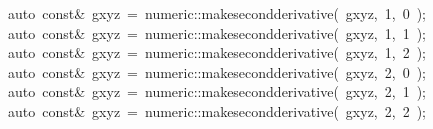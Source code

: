 \documentclass[9pt,onside,a4paper]{article}
\newcommand{\hlstd}[1]{\textcolor[rgb]{0.2,0,0.4}{#1}}
\newcommand{\hlnum}[1]{\textcolor[rgb]{0.2,0.73,0.02}{#1}}
\newcommand{\hlopt}[1]{\textcolor[rgb]{0.33,0.33,0.33}{#1}}
\newcommand{\hlkwb}[1]{\textcolor[rgb]{0.96,0.55,0.14}{#1}}
\newcommand{\hlkwc}[1]{\textcolor[rgb]{0,0,1}{#1}}
\newcommand{\hlkwd}[1]{\textcolor[rgb]{0.82,0.11,0.93}{#1}}
\begin{document}
{\hlstd{}\hlstd{\ \ \ \ }\hlstd{}\hlkwc{auto\ }\hlstd{}\hlkwb{const}\hlstd{}\hlopt{\&\ }\hlstd{gxyz\ }\hlopt{=\ }\hlstd{numeric}\hlopt{::}\hlstd{}\hlkwd{make\textunderscore second\textunderscore derivative}\hlstd{}\hlopt{(\ }\hlstd{gxyz}\hlopt{,\ }\hlstd{}\hlnum{1}\hlstd{}\hlopt{,\ }\hlstd{}\hlnum{0\ }\hlstd{}\hlopt{);}\hspace*{\fill}\\
\hlstd{}\hlstd{\ \ \ \ }\hlstd{}\hlkwc{auto\ }\hlstd{}\hlkwb{const}\hlstd{}\hlopt{\&\ }\hlstd{gxyz\ }\hlopt{=\ }\hlstd{numeric}\hlopt{::}\hlstd{}\hlkwd{make\textunderscore second\textunderscore derivative}\hlstd{}\hlopt{(\ }\hlstd{gxyz}\hlopt{,\ }\hlstd{}\hlnum{1}\hlstd{}\hlopt{,\ }\hlstd{}\hlnum{1\ }\hlstd{}\hlopt{);}\hspace*{\fill}\\
\hlstd{}\hlstd{\ \ \ \ }\hlstd{}\hlkwc{auto\ }\hlstd{}\hlkwb{const}\hlstd{}\hlopt{\&\ }\hlstd{gxyz\ }\hlopt{=\ }\hlstd{numeric}\hlopt{::}\hlstd{}\hlkwd{make\textunderscore second\textunderscore derivative}\hlstd{}\hlopt{(\ }\hlstd{gxyz}\hlopt{,\ }\hlstd{}\hlnum{1}\hlstd{}\hlopt{,\ }\hlstd{}\hlnum{2\ }\hlstd{}\hlopt{);}\hspace*{\fill}\\
\hlstd{}\hlstd{\ \ \ \ }\hlstd{}\hlkwc{auto\ }\hlstd{}\hlkwb{const}\hlstd{}\hlopt{\&\ }\hlstd{gxyz\ }\hlopt{=\ }\hlstd{numeric}\hlopt{::}\hlstd{}\hlkwd{make\textunderscore second\textunderscore derivative}\hlstd{}\hlopt{(\ }\hlstd{gxyz}\hlopt{,\ }\hlstd{}\hlnum{2}\hlstd{}\hlopt{,\ }\hlstd{}\hlnum{0\ }\hlstd{}\hlopt{);}\hspace*{\fill}\\
\hlstd{}\hlstd{\ \ \ \ }\hlstd{}\hlkwc{auto\ }\hlstd{}\hlkwb{const}\hlstd{}\hlopt{\&\ }\hlstd{gxyz\ }\hlopt{=\ }\hlstd{numeric}\hlopt{::}\hlstd{}\hlkwd{make\textunderscore second\textunderscore derivative}\hlstd{}\hlopt{(\ }\hlstd{gxyz}\hlopt{,\ }\hlstd{}\hlnum{2}\hlstd{}\hlopt{,\ }\hlstd{}\hlnum{1\ }\hlstd{}\hlopt{);}\hspace*{\fill}\\
\hlstd{}\hlstd{\ \ \ \ }\hlstd{}\hlkwc{auto\ }\hlstd{}\hlkwb{const}\hlstd{}\hlopt{\&\ }\hlstd{gxyz\ }\hlopt{=\ }\hlstd{numeric}\hlopt{::}\hlstd{}\hlkwd{make\textunderscore second\textunderscore derivative}\hlstd{}\hlopt{(\ }\hlstd{gxyz}\hlopt{,\ }\hlstd{}\hlnum{2}\hlstd{}\hlopt{,\ }\hlstd{}\hlnum{2\ }\hlstd{}\hlopt{);}\hspace*{\fill}\\
}
\end{document}
